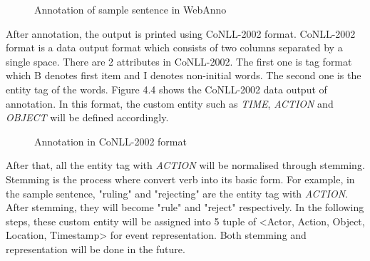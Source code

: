 \documentclass[twoside]{utmthesis}
\begin{document}
\begin{figure}[H]
	\centering
	\caption{Annotation of sample sentence in WebAnno}
	\label{fig:annotation}
\end{figure}
\vspace{-1cm}
After annotation, the output is printed using CoNLL-2002 format. CoNLL-2002 format is a data output format which consists of two columns separated by a single space. There are 2 attributes in CoNLL-2002. The first one is tag format which B denotes first item and I denotes non-initial words. The second one is the entity tag of the words. Figure 4.4 shows the CoNLL-2002 data output of annotation. In this format, the custom entity such as \textit{TIME}, \textit{ACTION} and \textit{OBJECT} will be defined accordingly. 
\begin{figure}[H]
	\centering
	\caption{Annotation in CoNLL-2002 format}
	\label{fig:annotationresult}
\end{figure}
\vspace{-1cm}

After that, all the entity tag with \textit{ACTION} will be normalised through stemming. Stemming is the process where convert verb into its basic form. For example, in the sample sentence, "ruling" and "rejecting" are the entity tag with \textit{ACTION}. After stemming, they will become "rule" and "reject" respectively. In the following steps, these custom entity will be assigned into 5 tuple of <Actor, Action, Object, Location, Timestamp> for event representation. Both stemming and representation will be done in the future.  
\end{document}

